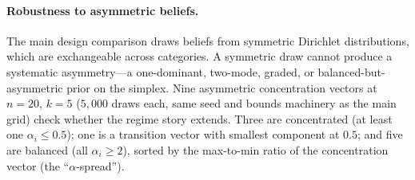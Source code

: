 \paragraph{Robustness to asymmetric beliefs.}
The main design comparison draws beliefs from symmetric Dirichlet distributions, which are exchangeable across categories.
A symmetric draw cannot produce a systematic asymmetry---a one-dominant, two-mode, graded, or balanced-but-asymmetric prior on the simplex.
Nine asymmetric concentration vectors at \(n=20\), \(k=5\) (\(5{,}000\) draws each, same seed and bounds machinery as the main grid) check whether the regime story extends.
Three are concentrated (at least one \(\alpha_i\le 0.5\)); one is a transition vector with smallest component at \(0.5\); and five are balanced (all \(\alpha_i\ge 2\)), sorted by the max-to-min ratio of the concentration vector (the ``\(\alpha\)-spread'').


